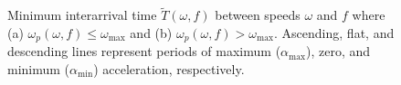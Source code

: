 \begin{figure}
\centering
      \label{fig:mintPeak}
  \label{mintPeak}
      \label{fig:mintMax}
  \label{mintMax}
\caption{Minimum interarrival time $\widetilde{T}(\omega,f)$ between speeds $\omega$ and $f$ where (a) $\omega_p(\omega,f) \leq \omega_{\max}$ and (b) $\omega_p(\omega,f) > \omega_{\max}$.
Ascending, flat, and descending lines represent periods of maximum ($\alpha_{\max}$), zero, and  minimum ($\alpha_{\min}$) acceleration, respectively.}
\label{fig:mint}
\end{figure}

